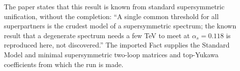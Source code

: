 The paper states that this result is known from standard supersymmetric unification, without the completion: ``A single common threshold for all superpartners is the crudest model of a supersymmetric spectrum; the known result that a degenerate spectrum needs a few TeV to meet at $\alpha_{s} = 0.118$ is reproduced here, not discovered.'' The imported Fact  supplies the Standard Model and minimal supersymmetric two-loop matrices and top-Yukawa coefficients from which the run is made.
